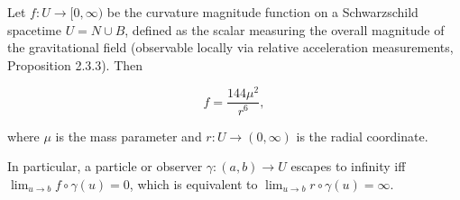 Let $f: U \to [0,\infty)$ be the curvature magnitude function on a Schwarzschild spacetime $U = N \cup B$, defined as the scalar measuring the overall magnitude of the gravitational field (observable locally via relative acceleration measurements, Proposition 2.3.3). Then

$$f = \frac{144\mu^2}{r^6},$$

where $\mu$ is the mass parameter and $r: U \to (0,\infty)$ is the radial coordinate.

In particular, a particle or observer $\gamma: (a,b) \to U$ escapes to infinity iff $\lim_{u \to b} f \circ \gamma(u) = 0$, which is equivalent to $\lim_{u \to b} r \circ \gamma(u) = \infty$.
